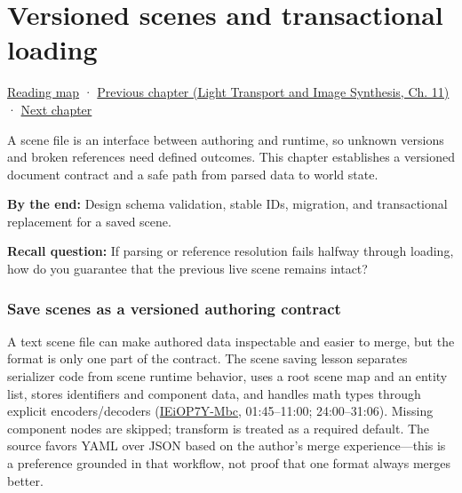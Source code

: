 \chapter{Versioned scenes and transactional loading}\label{06-engine-ii-ch033-versioned-scenes-and-transactional-loading}\hypertarget{06-engine-ii-ch033}{}\label{stagechapter:06-engine-ii-ch033}

\hypertarget{06-engine-ii-ch033-versioned-scenes-and-transactional-loading}{}

\hyperref[volume-reading-map]{Reading map} · \href{../04-Light-Transport-and-Image-Synthesis/main.pdf\#nameddest=06-engine-ii-ch032-terrain-materials-and-image-composition}{Previous chapter (Light Transport and Image Synthesis, Ch. 11)} · \hyperref[06-engine-ii-ch034-rigid-body-motion-from-forces-to-contact]{Next chapter}

A scene file is an interface between authoring and runtime, so unknown versions and broken references need defined outcomes. This chapter establishes a versioned document contract and a safe path from parsed data to world state.

\textbf{By the end:} Design schema validation, stable IDs, migration, and transactional replacement for a saved scene.

\textbf{Recall question:} If parsing or reference resolution fails halfway through loading, how do you guarantee that the previous live scene remains intact?

\subsection{Save scenes as a versioned authoring contract}\label{06-engine-ii-ch033-save-scenes-as-a-versioned-authoring-contract}

\hypertarget{06-engine-ii-ch033-save-scenes-as-a-versioned-authoring-contract}{}

A text scene file can make authored data inspectable and easier to merge, but the format is only one part of the contract. The scene saving lesson separates serializer code from scene runtime behavior, uses a root scene map and an entity list, stores identifiers and component data, and handles math types through explicit encoders/decoders (\href{https://www.youtube.com/watch?v=IEiOP7Y-Mbc}{IEiOP7Y-Mbc}, 01:45--11:00; 24:00--31:06). Missing component nodes are skipped; transform is treated as a required default. The source favors YAML over JSON based on the author's merge experience---this is a preference grounded in that workflow, not proof that one format always merges better.

